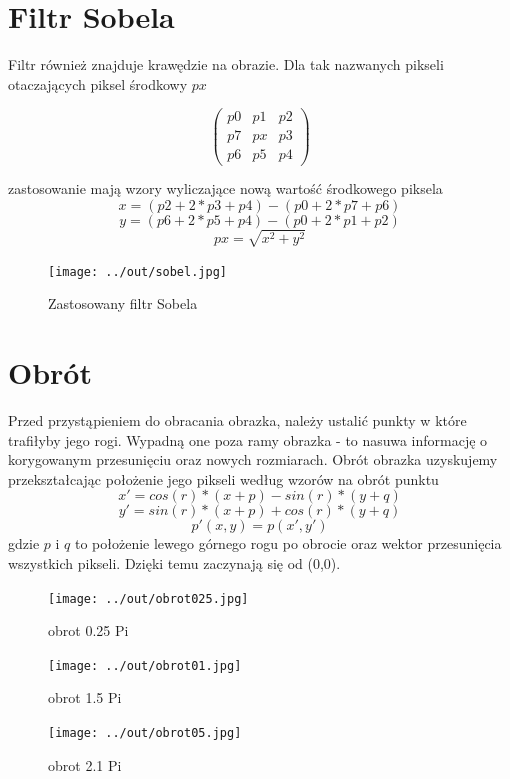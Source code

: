 \documentclass[a4paper,12pt]{article}
\begin{document}
\newpage
\section{Filtr Sobela}
Filtr również znajduje krawędzie na obrazie. Dla tak nazwanych pikseli otaczających piksel środkowy $px$
\begin{center}
\[ \left( \begin{array}{ccc}
p0 & p1 & p2 \\
p7 & px & p3 \\
p6 & p5 & p4 \end{array} \right)\] 
\end{center}
zastosowanie mają wzory wyliczające nową wartość środkowego piksela
$$x = (p2+2*p3+p4)-(p0+2*p7+p6)$$
$$y = (p6+2*p5+p4)-(p0+2*p1+p2)$$
$$px = \sqrt{x^2 + y^2}$$



\begin{figure}[h!]
   \centering
   \texttt{[image: ../out/sobel.jpg]}
   \caption{Zastosowany filtr Sobela}
\end{figure}



\newpage
\section{Obrót}
Przed przystąpieniem do obracania obrazka, należy ustalić punkty w które trafiłyby jego rogi. Wypadną one poza ramy obrazka - to nasuwa informację o korygowanym przesunięciu oraz nowych rozmiarach.
Obrót obrazka uzyskujemy przekształcając położenie jego pikseli według wzorów na obrót punktu
$$x' = cos(r)*(x+p) - sin(r)*(y+q)$$
$$y' = sin(r)*(x+p) + cos(r)*(y+q)$$
$$p'(x,y) = p(x', y')$$
gdzie $p$ i $q$ to położenie lewego górnego rogu po obrocie oraz wektor przesunięcia wszystkich pikseli. Dzięki temu zaczynają się od (0,0).

\newpage


\newpage
\begin{figure}[h!]
\begin{minipage}[t]{5cm}
\begin{center}
\texttt{[image: ../out/obrot025.jpg]}
\caption{obrot 0.25 Pi}
\end{center}
\end{minipage}
\hfill
\begin{minipage}[t]{5cm}
\begin{center}
\texttt{[image: ../out/obrot01.jpg]}
\caption{obrot 1.5 Pi}
\end{center}
\end{minipage}
\hfill
\begin{minipage}[t]{5cm}
\begin{center}
\texttt{[image: ../out/obrot05.jpg]}
\caption{obrot 2.1 Pi }
\end{center}
\end{minipage}
\end{figure}
\end{document}
